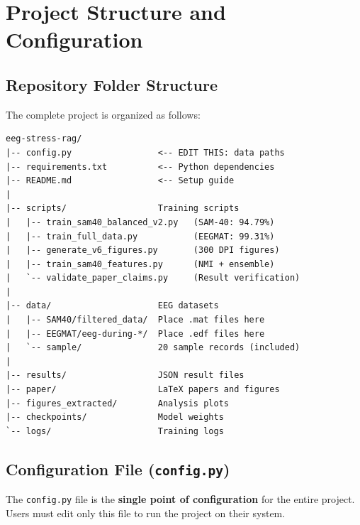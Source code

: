 \documentclass[11pt,a4paper]{article}
\begin{document}
\section{Project Structure and Configuration}

\subsection{Repository Folder Structure}

The complete project is organized as follows:

\begin{verbatim}
eeg-stress-rag/
|-- config.py                 <-- EDIT THIS: data paths
|-- requirements.txt          <-- Python dependencies
|-- README.md                 <-- Setup guide
|
|-- scripts/                  Training scripts
|   |-- train_sam40_balanced_v2.py   (SAM-40: 94.79%)
|   |-- train_full_data.py           (EEGMAT: 99.31%)
|   |-- generate_v6_figures.py       (300 DPI figures)
|   |-- train_sam40_features.py      (NMI + ensemble)
|   `-- validate_paper_claims.py     (Result verification)
|
|-- data/                     EEG datasets
|   |-- SAM40/filtered_data/  Place .mat files here
|   |-- EEGMAT/eeg-during-*/  Place .edf files here
|   `-- sample/               20 sample records (included)
|
|-- results/                  JSON result files
|-- paper/                    LaTeX papers and figures
|-- figures_extracted/        Analysis plots
|-- checkpoints/              Model weights
`-- logs/                     Training logs
\end{verbatim}

\subsection{Configuration File (\texttt{config.py})}

The \texttt{config.py} file is the \textbf{single point of configuration} for the entire project. Users must edit only this file to run the project on their system.
\end{document}
